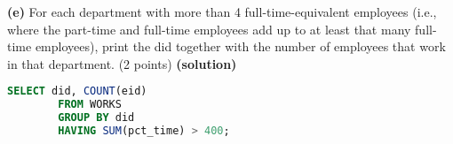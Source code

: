 \documentclass[11pt]{article}
\renewcommand\part[1]{\vspace{.10in}\textbf{(#1)}}
\begin{document}
\part{e} For each department with more than 4 full-time-equivalent employees (i.e., where the part-time and full-time employees add up to at least that many full-time employees), print the did together with the number of employees that work in that department. (2 points)
\part{solution}
\begin{lstlisting}[language=SQL]
	SELECT did, COUNT(eid)
		FROM WORKS
		GROUP BY did
		HAVING SUM(pct_time) > 400;
\end{lstlisting}
\end{document}
